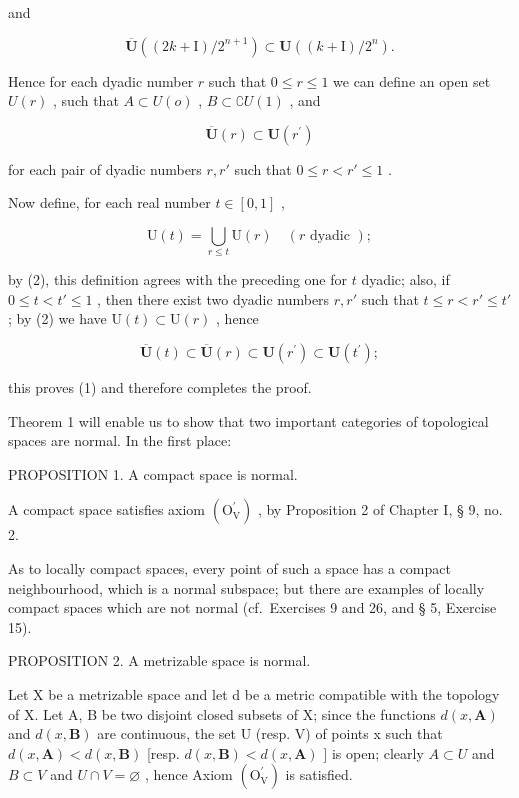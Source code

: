 and

\[
\overline {{{\mathbf {U}}}} ((2 k + \mathrm{I}) / 2 ^ {n + 1}) \subset \mathbf {U} ((k + \mathrm{I}) / 2 ^ {n}).
\]

Hence for each dyadic number \(r\) such that \(0 \leqslant r \leqslant 1\) we can define an open set \(U(r)\) , such that \(A \subset U(o)\) , \(B \subset \complement U(1)\) , and

\[
\overline {{{\mathbf {U}}}} (r) \subset \mathbf {U} (r ^ {\prime})\tag{2}
\]

for each pair of dyadic numbers \(r, r'\) such that \(0 \leqslant r < r' \leqslant 1\) .

Now define, for each real number \(t \in [0, 1]\) ,

\[
\mathrm{U} (t) = \bigcup_ {r \leqslant t} \mathrm{U} (r) \quad (r \text { dyadic });
\]

by (2), this definition agrees with the preceding one for \(t\) dyadic; also, if \(0 \leqslant t < t' \leqslant 1\) , then there exist two dyadic numbers \(r, r'\) such that \(t \leqslant r < r' \leqslant t'\) ; by (2) we have \(\mathrm{U}(t) \subset \mathrm{U}(r)\) , hence

\[
\overline {{{\mathbf {U}}}} (t) \subset \overline {{{\mathbf {U}}}} (r) \subset \mathbf {U} (r ^ {\prime}) \subset \mathbf {U} (t ^ {\prime});
\]

this proves (1) and therefore completes the proof.

Theorem 1 will enable us to show that two important categories of topological spaces are normal. In the first place:

PROPOSITION 1. A compact space is normal.

A compact space satisfies axiom \((\mathrm{O}_{\mathrm{V}}^{\prime})\) , by Proposition 2 of Chapter I, § 9, no. 2.

As to locally compact spaces, every point of such a space has a compact neighbourhood, which is a normal subspace; but there are examples of locally compact spaces which are not normal (cf.~Exercises 9 and 26, and § 5, Exercise 15).

PROPOSITION 2. A metrizable space is normal.

Let X be a metrizable space and let d be a metric compatible with the topology of X. Let A, B be two disjoint closed subsets of X; since the functions \(d(x, \mathbf{A})\) and \(d(x, \mathbf{B})\) are continuous, the set U (resp. V) of points x such that \(d(x, \mathbf{A}) < d(x, \mathbf{B})\) {[}resp. \(d(x, \mathbf{B}) < d(x, \mathbf{A})\) {]} is open; clearly \(A \subset U\) and \(B \subset V\) and \(U \cap V = \varnothing\) , hence Axiom \((\mathrm{O}_{\mathrm{V}}^{\prime})\) is satisfied.

